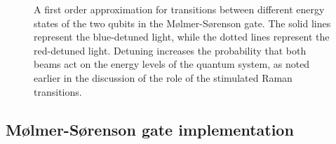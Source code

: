\documentclass[12pt,a4paper]{amsart}
\numberwithin{equation}{section}
\theoremstyle{plain}
\theoremstyle{definition}
\begin{document}
\begin{figure}
{}
    \caption{A first order approximation for transitions between different energy states of the two qubits in the M\o lmer-S\o renson gate. The solid lines represent the blue-detuned light, while the dotted lines represent the red-detuned light. Detuning increases the probability that both beams act on the energy levels of the quantum system, as noted earlier in the discussion of the role of the 
    stimulated Raman transitions.
    \cite{ioniTherComp}}
    \label{fig:ioniTherComp1}
\end{figure}



\subsection{M\o lmer-S\o renson gate implementation}
\end{document}
